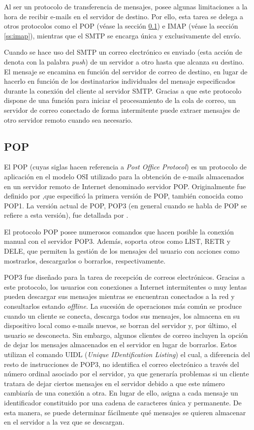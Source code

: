 Al ser un protocolo de transferencia de mensajes, posee algunas limitaciones a la hora de recibir e-mails en el servidor de destino. Por ello, esta tarea se delega a otros protocolos como el POP (véase la sección \ref{ss:pop}) e IMAP (véase la sección \ref{ss:imap}), mientras que el SMTP se encarga única y exclusivamente del envío.

Cuando se hace uso del SMTP un correo electrónico es enviado (esta acción de denota con la palabra \textit{push}) de un servidor a otro hasta que alcanza su destino. El mensaje se encamina en función del servidor de correo de destino, en lugar de hacerlo en función de los destinatarios individuales del mensaje especificados durante la conexión del cliente al servidor SMTP. Gracias a que este protocolo dispone de una función para iniciar el procesamiento de la cola de correo, un servidor de correo conectado de forma intermitente puede extraer mensajes de otro servidor remoto cuando sea necesario.

\subsection{POP}\label{ss:pop}
El POP (cuyas siglas hacen referencia a \textit{Post Office Protocol}) es un protocolo de aplicación en el modelo OSI utilizado para la obtención de e-mails almacenados en un servidor remoto de Internet denominado servidor POP. Originalmente fue definido por \cite{rfc918},que especificó la primera versión de POP, también conocida como POP1. La versión actual de POP, POP3 (en general cuando se habla de POP se refiere a esta versión), fue detallada por \cite{rfc1939}.

El protocolo POP posee numerosos comandos que hacen posible la conexión manual con el servidor POP3. Además, soporta otros como LIST, RETR y DELE, que permiten la gestión de los mensajes del usuario con acciones como mostrarlos, descargarlos o borrarlos, respectivamente.

POP3 fue diseñado para la tarea de recepción de correos electrónicos. Gracias a este protocolo, los usuarios con conexiones a Internet intermitentes o muy lentas pueden descargar sus mensajes mientras se encuentran conectados a la red y consultarlos estando \textit{offline}. La sucesión de operaciones más común se produce cuando un cliente se conecta, descarga todos sus mensajes, los almacena en su dispositivo local como e-mails nuevos, se borran del servidor y, por último, el usuario se desconecta. Sin embargo, algunos clientes de correo incluyen la opción de dejar los mensajes almacenados en el servidor en lugar de borrarlos. Estos utilizan el comando UIDL (\textit{Unique IDentification Listing}) el cual, a diferencia del resto de instrucciones de POP3, no identifica el correo electrónico a través del número ordinal asociado por el servidor, ya que generaría problemas si un cliente tratara de dejar ciertos mensajes en el servidor debido a que este número cambiaría de una conexión a otra. En lugar de ello, asigna a cada mensaje un identificador constituido por una cadena de caracteres única y permanente. De esta manera, se puede determinar fácilmente qué mensajes se quieren almacenar en el servidor a la vez que se descargan.

